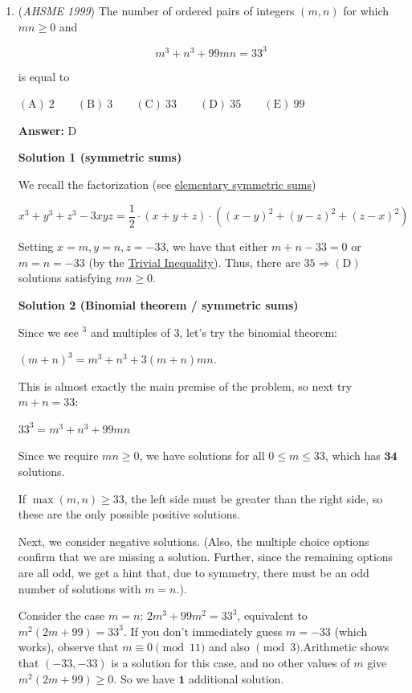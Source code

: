 \begin{enumerate}
	\item (\textit{AHSME 1999}) The number of ordered pairs of integers $(m,n)$ for which $mn \ge 0$ and


 
 \[m^3 + n^3 + 99mn = 33^3\]


 is equal to


 $\mathrm{(A) \ }2 \qquad \mathrm{(B) \ } 3\qquad \mathrm{(C) \ } 33\qquad \mathrm{(D) \ }35 \qquad \mathrm{(E) \ } 99$

 \textbf{Answer: }D



\textbf{Solution 1 (symmetric sums)}

We recall the factorization (see \href{https://artofproblemsolving.com/wiki/index.php?title=Elementary\_symmetric\_sum}{elementary symmetric sums})

 
 \[x^3 + y^3 + z^3 - 3xyz = \frac12\cdot(x + y + z)\cdot((x - y)^2 + (y - z)^2 + (z - x)^2)\]

 Setting $x = m,y = n,z = - 33$, we have that either $m + n - 33 = 0$ or $m = n = - 33$ (by the \href{https://artofproblemsolving.com/wiki/index.php?title=Trivial\_Inequality}{Trivial Inequality}). Thus, there are $35 \Longrightarrow \mathrm{(D)}$ solutions satisfying $mn \ge 0$.

 


 



\textbf{Solution 2 (Binomial theorem / symmetric sums)}

Since we see $^3$ and multiples of $3$, let's try the binomial theorem:

 $(m+n)^3 = m^3 + n^3 + 3(m+n)mn$.

 This is almost exactly the main premise of the problem, so next try $m+n=33$:

 $33^3 = m^3 + n^3 + 99mn$

 Since we require $mn \geq 0$,  we have solutions for all $0 \leq m \leq 33$, which has $\mathbf{ 34 }$ solutions.

 If $\max(m, n) \geq 33$, the left side must be greater than the right side, so these are the only possible positive solutions.

 Next, we consider negative solutions. (Also, the multiple choice options confirm that we are missing a solution. Further, since the remaining options are all odd, we get a hint that, due to symmetry, there must be an odd number of solutions with $m=n$.).

 Consider the case $m=n$: $2m^3 + 99m^2 = 33^3$, equivalent to $m^2(2m+99) = 33^3$. If you don't immediately guess $m=-33$ (which works), observe that $m \equiv 0 \pmod {11}$ and also $\pmod 3$.Arithmetic shows that $(-33,-33)$ is a solution for this case, and no other values of $m$ give $m^2(2m+99)  \geq 0$. So we have $\mathbf{1}$ additional solution.


\end{enumerate}
